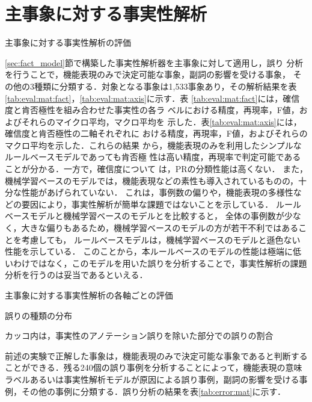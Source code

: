 \documentclass[japanese]{jnlp_1.4}
\begin{document}
\section{主事象に対する事実性解析}
\label{sec_matrix}

\begin{table}[b]
\caption{主事象に対する事実性解析の評価}
\label{tab:eval:mat:fact}

\end{table}

\ref{sec:fact_model}節で構築した事実性解析器を主事象に対して適用し，誤り
分析を行うことで，機能表現のみで決定可能な事象，副詞の影響を受ける事象，
その他の3種類に分類する．対象となる事象は1,533事象あり，その解析結果を表
\ref{tab:eval:mat:fact}，\ref{tab:eval:mat:axis}に示す．表
\ref{tab:eval:mat:fact}には，確信度と肯否極性を組み合わせた事実性の各ラ
ベルにおける精度，再現率，F値，およびそれらのマイクロ平均，マクロ平均を
示した．表\ref{tab:eval:mat:axis}には，確信度と肯否極性の二軸それぞれに
おける精度，再現率，F値，およびそれらのマクロ平均を示した．これらの結果
から，機能表現のみを利用したシンプルなルールベースモデルであっても肯否極
性は高い精度，再現率で判定可能であることが分かる．一方で，確信度について
は，PRの分類性能は高くない．
また，機械学習ベースのモデルでは，機能表現などの素性も導入されているものの，十分な性能があげられていない．
これは，事例数の偏りや，機能表現の多様性などの要因により，事実性解析が簡単な課題ではないことを示している．
ルールベースモデルと機械学習ベースのモデルとを比較すると，
全体の事例数が少なく，大きな偏りもあるため，機械学習ベースのモデルの方が若干不利ではあることを考慮しても，
ルールベースモデルは，機械学習ベースのモデルと遜色ない性能を示している．
このことから，本ルールベースのモデルの性能は極端に低いわけではなく，このモデルを用いた誤りを分析することで，事実性解析の課題分析を行うのは妥当であるといえる．

\begin{table}[b]
\caption{主事象に対する事実性解析の各軸ごとの評価}
\label{tab:eval:mat:axis}

\end{table}
\begin{table}[b]
\caption{誤りの種類の分布}
\label{tab:error:mat}

\vspace{4pt}\centering\small カッコ内は，事実性のアノテーション誤りを除いた部分での誤りの割合
\end{table}

前述の実験で正解した事象は，機能表現のみで決定可能な事象であると判断する
ことができる．残る240個の誤り事例を分析することによって，機能表現の意味
ラベルあるいは事実性解析モデルが原因による誤り事例，副詞の影響を受ける事
例，その他の事例に分類する．誤り分析の結果を表\ref{tab:error:mat}に示す．
\end{document}
